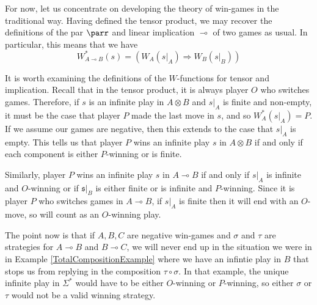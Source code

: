 \documentclass[11pt]{article} %
\theoremstyle{plain} %
\theoremstyle{definition} %
\theoremstyle{note}
\theoremstyle{exercisestyle}
\newcommand{\tensor}{\otimes}
\renewcommand{\implies}{\multimap}
\newcommand{\comp}[2]{#1 \circ #2}
\newcommand{\s}{\mathfrak s}
\newcommand{\st}{{\Sigma^*}}
\begin{document}
For now, let us concentrate on developing the theory of win-games in the traditional way.  Having defined the tensor product, we may recover the definitions of the par $\parr$ and linear implication $\implies$ of two games as usual.  In particular, this means that we have
\[
  W_{A\implies B}^*(s) = (W_A(s\vert_A) \Rightarrow W_B(s\vert_B))
  \]

It is worth examining the definitions of the $W$-functions for tensor and implication.  Recall that in the tensor product, it is always player $O$ who switches games.  Therefore, if $s$ is an infinite play in $A\tensor B$ and $s\vert_A$ is finite and non-empty, it must be the case that player $P$ made the last move in $s$, and so $W_A^*(s\vert_A)=P$.  If we assume our games are negative, then this extends to the case that $s\vert_A$ is empty.  This tells us that player $P$ wins an infinite play $s$ in $A\tensor B$ if and only if each component is either $P$-winning or is finite.  

Similarly, player $P$ wins an infinite play $s$ in $A\implies B$ if and only if $s\vert_A$ is infinite and $O$-winning or if $\s\vert_B$ is either finite or is infinite and $P$-winning.  Since it is player $P$ who switches games in $A\implies B$, if $s\vert_A$ is finite then it will end with an $O$-move, so will count as an $O$-winning play.  

The point now is that if $A,B,C$ are negative win-games and $\sigma$ and $\tau$ are strategies for $A\implies B$ and $B\implies C$, we will never end up in the situation we were in in Example \ref{TotalCompositionExample} where we have an infintie play in $B$ that stops us from replying in the composition $\comp\tau\sigma$.  In that example, the unique infinite play in $\st$ would have to be either $O$-winning or $P$-winning, so either $\sigma$ or $\tau$ would not be a valid winning strategy.  
\end{document}
